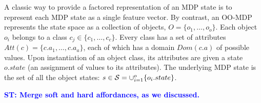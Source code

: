 \documentclass[conference]{IEEEtran}
\newcommand{\stnote}[1]{\textcolor{Blue}{\textbf{ST: #1}}}
\begin{document}
A classic way to provide a factored representation of an MDP state is to represent
each MDP state as a single feature vector. By contrast, an OO-MDP represents the state space as a collection of objects,
$O = \{o_1, \ldots, o_o \}$.  Each object $o_i$ belongs to a
class $c_j \in  \{c_1, \ldots, c_c\}$. Every class has a set of attributes
$Att(c) = \{c.a_1, \ldots, c.a_a \}$, each of which has a domain $Dom(c.a)$ of possible values.
Upon instantiation of an object class, its attributes are given a state $o.state$
(an assignment of values to its attributes).  The underlying MDP state is the set
of all the object states: $s \in {\cal S} = \cup_{i = 1}^o \{o_i.state\}$. 




\stnote{Merge soft and hard affordances, as we discussed.}
\end{document}
